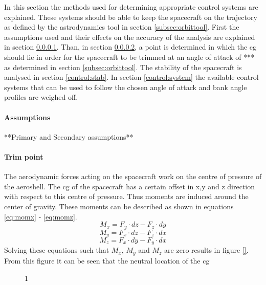 In this section the methods used for determining appropriate control systems are explained. These systems should be able to keep the spacecraft on the trajectory as defined by the astrodynamics tool in section \ref{subsec:orbittool}. First the assumptions used and their effects on the accuracy of the analysis are explained in section \ref{control:assumptions}. Than, in section \ref{control:trim}, a point is determined in which the \gls{cg} should lie in order for the spacecraft to be trimmed at an angle of attack of *** as determined in section  \ref{subsec:orbittool}. The stability of the spacecraft is analysed in section \ref{control:stab}. In section \ref{control:system} the available control systems that can be used to follow the chosen angle of attack and bank angle profiles are weighed off.

\paragraph{Assumptions}
\label{control:assumptions}
**Primary and Secondary assumptions**

\paragraph{Trim point}
\label{control:trim}
The aerodynamic forces acting on the spacecraft work on the centre of pressure of the aeroshell. The \gls{cg} of the spacecraft has a certain offset in x,y and z direction with respect to this centre of pressure. Thus moments are induced around the center of gravity. These moments can be described as shown in equations \ref{eq:momx} - \ref{eq:momz}.
\begin{equation}
\label{eq:momx}
M_x = F_y \cdot dz - F_z \cdot dy
\end{equation}
\begin{equation}
\label{eq:momy}
M_y = F_x \cdot dz - F_z \cdot dx
\end{equation}
\begin{equation}
\label{eq:momz}
M_z = F_x \cdot dy - F_y \cdot dx
\end{equation}
Solving these equations such that $M_{x}$, $M_{y}$ and $M_{z}$ are zero results in figure \ref{}. From this figure it can be seen that the neutral location of the \gls{cg} 

\begin{figure}[h]
	\centering
	\setlength{} 
	\setlength{}
	\caption{1}
	\label{fig:}
\end{figure}

